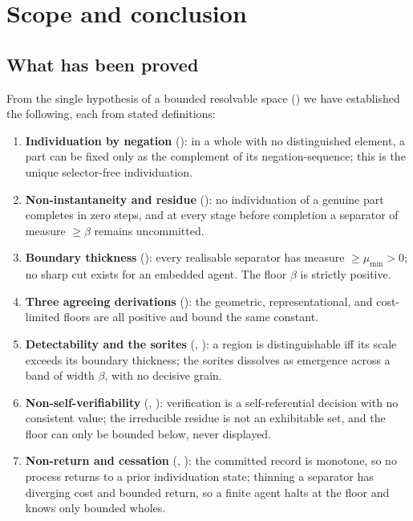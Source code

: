 \documentclass[11pt,a4paper]{article}
\theoremstyle{thmstyle}
\theoremstyle{definition}
\theoremstyle{remark}
\newcommand{\thick}{\beta}
\begin{document}
\section{Scope and conclusion}
\label{sec:scope}

\subsection{What has been proved}

From the single hypothesis of a bounded resolvable space () we have
established the following, each from stated definitions:

\begin{enumerate}[label=(\arabic*),leftmargin=2.4em]
\item \textbf{Individuation by negation} (): in a whole
with no distinguished element, a part can be fixed only as the complement of its
negation-sequence; this is the unique selector-free individuation.
\item \textbf{Non-instantaneity and residue} (): no
individuation of a genuine part completes in zero steps, and at every stage before
completion a separator of measure $\ge\thick$ remains uncommitted.
\item \textbf{Boundary thickness} (): every realisable
separator has measure $\ge\mu_{\min}>0$; no sharp cut exists for an embedded
agent. The floor $\thick$ is strictly positive.
\item \textbf{Three agreeing derivations} (): the
geometric, representational, and cost-limited floors are all positive and bound
the same constant.
\item \textbf{Detectability and the sorites} (,
): a region is distinguishable iff its scale exceeds its
boundary thickness; the sorites dissolves as emergence across a band of width
$\thick$, with no decisive grain.
\item \textbf{Non-self-verifiability} (,
): verification is a self-referential decision with
no consistent value; the irreducible residue is not an exhibitable set, and the
floor can only be bounded below, never displayed.
\item \textbf{Non-return and cessation} (,
): the committed record is monotone, so no process returns to
a prior individuation state; thinning a separator has diverging cost and bounded
return, so a finite agent halts at the floor and knows only bounded wholes.
\end{enumerate}
\end{document}

